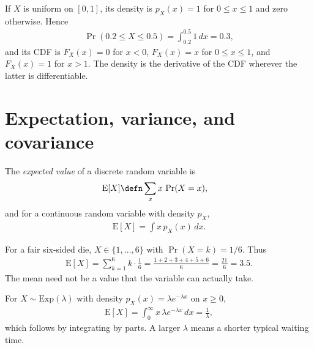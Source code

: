 \documentclass[a4paper, 12pt]{book}
\begin{document}
\begin{example}
    If $X$ is uniform on $[0,1]$, its density is $p_X(x)=1$ for $0\leq x\leq1$
    and zero otherwise. Hence
    \begin{align}
        \Pr(0.2 \leq X \leq 0.5) = \int_{0.2}^{0.5} 1\,dx = 0.3,
    \end{align}
    and its CDF is $F_X(x)=0$ for $x<0$, $F_X(x)=x$ for $0\leq x\leq1$, and
    $F_X(x)=1$ for $x>1$. The density is the derivative of the CDF wherever the
    latter is differentiable.
\end{example}


\section{Expectation, variance, and covariance}

\begin{definition}
    The \emph{expected value} of a discrete random variable is
\begin{align}
    \mathrm{E}[X] &\defn \sum_x x \, \Pr(X = x),
\end{align}
and for a continuous random variable with density $p_X$,
\begin{align}
    \mathrm{E}[X] = \int x \, p_X(x) \, dx.
\end{align}
\end{definition}
\begin{example}
    For a fair six-sided die, $X\in\{1,\ldots,6\}$ with $\Pr(X=k)=1/6$. Thus
    \begin{align}
        \mathrm{E}[X] = \sum_{k=1}^6 k\cdot\frac16
        = \frac{1+2+3+4+5+6}{6} = \frac{21}{6} = 3.5.
    \end{align}
    The mean need not be a value that the variable can actually take.
\end{example}

\begin{example}
    For $X\sim\mathrm{Exp}(\lambda)$ with density
    $p_X(x)=\lambda e^{-\lambda x}$ on $x\geq0$,
    \begin{align}
        \mathrm{E}[X] = \int_0^\infty x\,\lambda e^{-\lambda x}\,dx
        = \frac{1}{\lambda},
    \end{align}
    which follows by integrating by parts. A larger $\lambda$ means a shorter
    typical waiting time.
\end{example}
\end{document}
